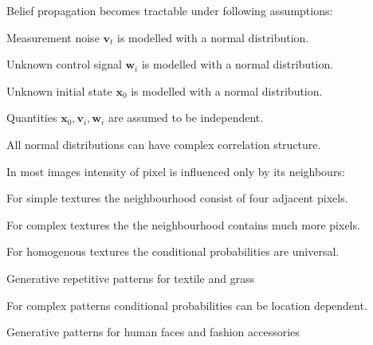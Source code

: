 \documentclass[landscape,footrule]{foils}
\renewcommand{\vec}[1]{\boldsymbol{#1}}
\begin{document}


Belief propagation becomes tractable under following assumptions:
\begin{triangles}
\item Measurement noise $\vec{v}_t$ is modelled with a normal distribution.
\item Unknown control signal $\vec{w}_i$ is modelled with a normal distribution.
\item Unknown initial state $\vec{x}_0$ is modelled with a normal distribution.
\item Quantities $\vec{x}_0, \vec{v}_i, \vec{w}_i$ are assumed to be independent.
\item All normal distributions can have complex correlation structure.
\end{triangles}




In most images intensity of pixel is influenced only by its neighbours:
\begin{triangles}
\item For simple textures the neighbourhood consist of four adjacent pixels.
\item For complex textures the the neighbourhood contains much more pixels.
\item For homogenous textures the conditional probabilities are universal\vspace*{0.5ex}.
\begin{diamonds}
\item Generative repetitive patterns for textile and grass\vspace*{1ex}   
\end{diamonds}

\item For complex patterns conditional probabilities can be location dependent.\vspace*{0.5ex}

\begin{diamonds}
\item Generative patterns for human faces and fashion accessories 
\end{diamonds}
\end{triangles}

\end{document}
